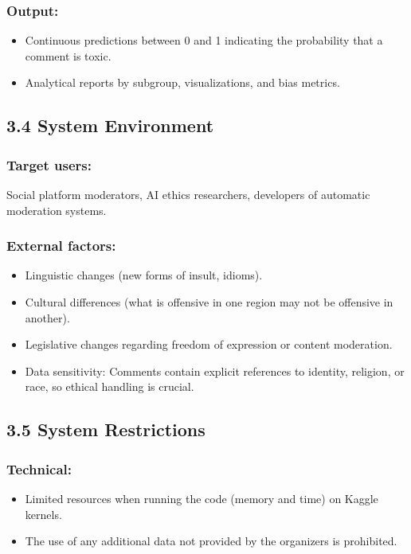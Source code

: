 \documentclass[a4paper,12pt]{article}
\begin{document}
\subsubsection*{Output:}
\begin{itemize}
    \item Continuous predictions between 0 and 1 indicating the probability that a comment is toxic.
    \item Analytical reports by subgroup, visualizations, and bias metrics.
\end{itemize}

\subsection*{3.4 System Environment}

\subsubsection*{Target users:}
Social platform moderators, AI ethics researchers, developers of automatic moderation systems.

\subsubsection*{External factors:}
\begin{itemize}
    \item Linguistic changes (new forms of insult, idioms).
    \item Cultural differences (what is offensive in one region may not be offensive in another).
    \item Legislative changes regarding freedom of expression or content moderation.
    \item Data sensitivity: Comments contain explicit references to identity, religion, or race, so ethical handling is crucial.
\end{itemize}

\subsection*{3.5 System Restrictions}

\subsubsection*{Technical:}
\begin{itemize}
    \item Limited resources when running the code (memory and time) on Kaggle kernels.
    \item The use of any additional data not provided by the organizers is prohibited.
\end{itemize}
\end{document}

